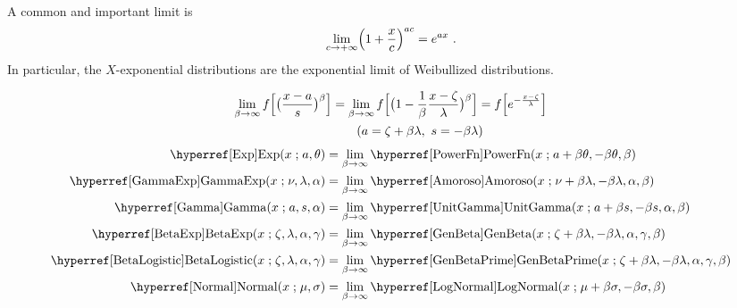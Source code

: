

\clearpage
{}
\label{sec:Limits}

\label{sec:Limits:exp}
A common and important limit is 
\[
\lim_{c\rightarrow+\infty} \Left(1 + \frac{x}{c} \Right)^{a c} = e^{a x} \ . \checked
\notag
\]
In particular, the $X$-exponential distributions are the exponential limit of Weibullized distributions.

\begin{align*}
\lim_{\beta\rightarrow\infty} f\Bigl[ \bigl(\frac{x-a}{s}\bigr)^{\beta} \Bigr]
&= \lim_{\beta\rightarrow \infty} f\Bigl[\bigl(1 - \frac{1}{\beta} \frac{x-\pLoc }{ \pScale}\bigr)^{\beta}  \Bigr] =  f\Bigl[ e^{-\frac{x-\pLoc}{\pScale}} \Bigr] \checked
\\ & \qquad (a = \pLoc + \beta\pScale, \ s = - \beta \pScale) 
\checked
\end{align*}
\begin{align*}
\opr{Exp}(x\given a,\theta) &=  \lim_{\beta\rightarrow\infty} \opr{PowerFn} (x\given a+\beta\theta,-\beta\theta,\beta)
\checked
\\
\opr{GammaExp}(x\given \nu, \lambda, \alpha) &=  \lim_{\beta\rightarrow\infty} \opr{Amoroso}(x\given \nu+\beta \lambda,-\beta \lambda, \alpha,\beta)
\checked
\\
\opr{Gamma}(x\given a,s,\alpha) &= \lim_{\beta\rightarrow\infty} \opr{UnitGamma}(x\given a+\beta s,-\beta s, \alpha,\beta) 
\checked
\\
\opr{BetaExp}(x\given \pLoc, \pScale, \alpha, \gamma) 
& = \lim_{\beta\rightarrow\infty } \opr{GenBeta}(x\given \pLoc+\beta\lambda, -\beta\pScale, \alpha, \gamma, \beta) 
\checked
\\
  \opr{BetaLogistic}(x\given \pLoc, \pScale, \alpha, \gamma)  &=
 \lim_{\beta\rightarrow\infty}  \opr{GenBetaPrime}(x\given \pLoc+\beta\pScale, -\beta \pScale, \alpha, \gamma, \beta)  
\checked
\\
\opr{Normal}(x\given \mu, \sigma) & =   \lim_{\beta\rightarrow\infty} \opr{LogNormal}(x\given \mu + \beta\sigma, -\beta\sigma, \beta) \checked
\end{align*}



